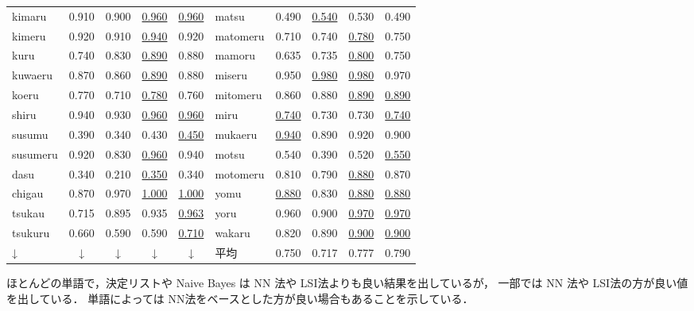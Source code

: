 \begin{table}[htbp]
\begin{center}
\begin{tabular}{|p{}|c|c|c|c||p{}|c|c|c|c|}
kimaru     & 0.910   & 0.900 & \underline{0.960}   &  \underline{0.960}     & matsu      & 0.490   & \underline{0.540} & 0.530  & 0.490      \\
kimeru     & 0.920   & 0.910 & \underline{0.940}   &  0.920     & matomeru   & 0.710   & 0.740 & \underline{0.780}  & 0.750      \\
kuru       & 0.740   & 0.830 & \underline{0.890}   &  0.880     & mamoru     & 0.635   & 0.735 & \underline{0.800}  & 0.750      \\
kuwaeru    & 0.870   & 0.860 & \underline{0.890}   &  0.880     & miseru     & 0.950   & \underline{0.980} & \underline{0.980}  & 0.970      \\
koeru      & 0.770   & 0.710 & \underline{0.780}   &  0.760     & mitomeru   & 0.860   & 0.880 & \underline{0.890}  & \underline{0.890}      \\
shiru      & 0.940   & 0.930 & \underline{0.960}   &  \underline{0.960}     & miru       & \underline{0.740}   & 0.730 & 0.730  & \underline{0.740}      \\
susumu     & 0.390   & 0.340 & 0.430   &  \underline{0.450}     & mukaeru    & \underline{0.940}   & 0.890 & 0.920  & 0.900      \\
susumeru   & 0.920   & 0.830 & \underline{0.960}   &  0.940     & motsu      & 0.540   & 0.390 & 0.520  & \underline{0.550}      \\
dasu       & 0.340   & 0.210 & \underline{0.350}   &  0.340     & motomeru   & 0.810   & 0.790 & \underline{0.880}  & 0.870      \\
chigau     & 0.870   & 0.970 & \underline{1.000}   &  \underline{1.000}     & yomu       & \underline{0.880}   & 0.830 & \underline{0.880}  & \underline{0.880}      \\
tsukau     & 0.715   & 0.895 & 0.935   &  \underline{0.963}     & yoru       & 0.960   & 0.900 & \underline{0.970}  & \underline{0.970}      \\
tsukuru    & 0.660   & 0.590 & 0.590   &  \underline{0.710}     & wakaru     & 0.820   & 0.890 & \underline{0.900}  & \underline{0.900}      \\ \hline
  ↓  &   ↓    &     ↓     & ↓ & ↓  &   平均         & 0.750   & 0.717 & 0.777 & 0.790      \\ \hline
    \end{tabular}
  \end{center}
\end{table}

ほとんどの単語で，決定リストや Naive Bayes は NN 法や LSI法よりも良い結果を出しているが，
一部では NN 法や LSI法の方が良い値を出している．
単語によっては NN法をベースとした方が良い場合もあることを示している．


